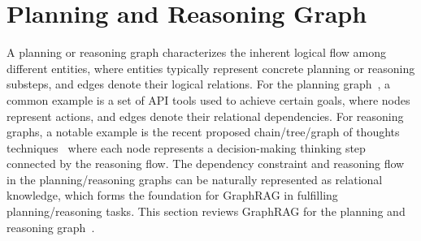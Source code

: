 
\section{Planning and Reasoning Graph \texorpdfstring{\emojiplantitle}{Planning and Reasoning Graph}}
\label{sec-reasonplan}

A planning or reasoning graph characterizes the inherent logical flow among different entities, where entities typically represent concrete planning or reasoning substeps, and edges denote their logical relations. For the planning graph~\cite{shen2024hugginggpt, zhuangtoolchain}, a common example is a set of API tools used to achieve certain goals, where nodes represent actions, and edges denote their relational dependencies. For reasoning graphs, a notable example is the recent proposed chain/tree/graph of thoughts techniques~\cite{besta2024graph, wei2022chain, yao2024tree} where each node represents a decision-making thinking step connected by the reasoning flow. The dependency constraint and reasoning flow in the planning/reasoning graphs can be naturally represented as relational knowledge, which forms the foundation for GraphRAG in fulfilling planning/reasoning tasks. This section reviews GraphRAG for the planning and reasoning graph~\cite{besta2024graph, lin2024graph, madaan2021could, saha2021explagraphs, sakib2024consolidating, shen2024hugginggpt, shen2023taskbench, song2023llm, song2023restgpt, wu2024can, wei2022chain, xu2024p, yao2024tree, zhao2024large, zhuangtoolchain, hao2023reasoning}.


